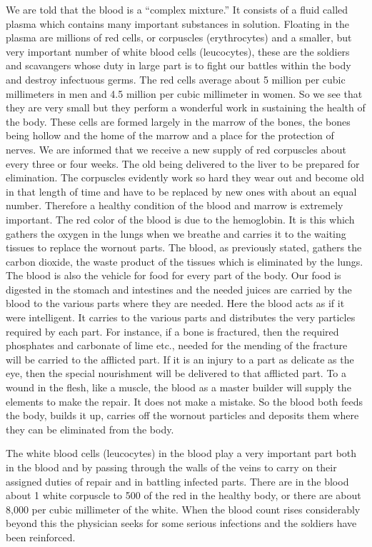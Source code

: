 We are told that the blood is a ``complex mixture.'' It consists of a fluid called plasma which
contains many important substances in solution. Floating in the plasma are millions of red
cells, or corpuscles (erythrocytes) and a smaller, but very important number of white blood
cells (leucocytes), these are the soldiers and scavangers whose duty in large part is to fight
our battles within the body and destroy infectuous germs. The red cells average about 5
million per cubic millimeters in men and 4.5 million per cubic millimeter in women. So we
see that they are very small but they perform a wonderful work in sustaining the health of the
body. These cells are formed largely in the marrow of the bones, the bones being hollow and
the home of the marrow and a place for the protection of nerves. We are informed that we
receive a new supply of red corpuscles about every three or four weeks. The old being
delivered to the liver to be prepared for elimination. The corpuscles evidently work so hard
they wear out and become old in that length of time and have to be replaced by new ones
with about an equal number. Therefore a healthy condition of the blood and marrow is
extremely important. The red color of the blood is due to the hemoglobin. It is this which
gathers the oxygen in the lungs when we breathe and carries it to the waiting tissues to
replace the wornout parts. The blood, as previously stated, gathers the carbon dioxide, the
waste product of the tissues which is eliminated by the lungs. The blood is also the vehicle
for food for every part of the body. Our food is digested in the stomach and intestines and the
needed juices are carried by the blood to the various parts where they are needed. Here the
blood acts as if it were intelligent. It carries to the various parts and distributes the very
particles required by each part. For instance, if a bone is fractured, then the required
phosphates and carbonate of lime etc., needed for the mending of the fracture will be carried
to the afflicted part. If it is an injury to a part as delicate as the eye, then the special
nourishment will be delivered to that afflicted part. To a wound in the flesh, like a muscle,
the blood as a master builder will supply the elements to make the repair. It does not make a
mistake. So the blood both feeds the body, builds it up, carries off the wornout particles and
deposits them where they can be eliminated from the body.

The white blood cells (leucocytes) in the blood play a very important part both in the blood
and by passing through the walls of the veins to carry on their assigned duties of repair and in
battling infected parts. There are in the blood about 1 white corpuscle to 500 of the red in the
healthy body, or there are about 8,000 per cubic millimeter of the white. When the blood
count rises considerably beyond this the physician seeks for some serious infections and the
soldiers have been reinforced.

